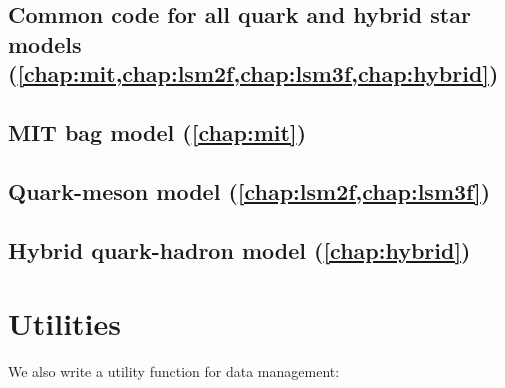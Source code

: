 \subsection*{Common code for all quark and hybrid star models (\cref{chap:mit,chap:lsm2f,chap:lsm3f,chap:hybrid})}

\subsection*{MIT bag model (\cref{chap:mit})}

\subsection*{Quark-meson model (\cref{chap:lsm2f,chap:lsm3f})}

\subsection*{Hybrid quark-hadron model (\cref{chap:hybrid})}

\section{Utilities}

We also write a utility function for data management:

